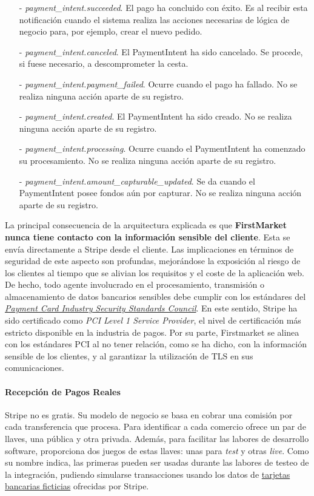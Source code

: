 \documentclass[a4paper,12pt,twoside,openright]{report}
\begin{document}
    \begin{itemize}
    	\item[-] \emph{payment\_intent.succeeded}. El pago ha concluido con éxito. Es al recibir esta notificación cuando el sistema realiza las acciones necesarias de lógica de negocio para, por ejemplo, crear el nuevo pedido.
    	\item[-] \emph{payment\_intent.canceled}. El PaymentIntent ha sido cancelado. Se procede, si fuese necesario, a descomprometer la cesta.
    	\item[-] \emph{payment\_intent.payment\_failed}. Ocurre cuando el pago ha fallado. No se realiza ninguna acción aparte de su registro.
    	\item[-] \emph{payment\_intent.created}. El PaymentIntent ha sido creado. No se realiza ninguna acción aparte de su registro.
    	\item[-] \emph{payment\_intent.processing}. Ocurre cuando el PaymentIntent ha comenzado su procesamiento. No se realiza ninguna acción aparte de su registro.
    	\item[-] \emph{payment\_intent.amount\_capturable\_updated}. Se da cuando el PaymentIntent posee fondos aún por capturar. No se realiza ninguna acción aparte de su registro.
    \end{itemize}
    
    La principal consecuencia de la arquitectura explicada es que \textbf{FirstMarket nunca tiene contacto con la información sensible del cliente}. Esta se envía directamente a Stripe desde el cliente. Las implicaciones en términos de seguridad de este aspecto son profundas, mejorándose la exposición al riesgo de los clientes al tiempo que se alivian los requisitos y el coste de la aplicación web. De hecho, todo agente involucrado en el procesamiento, transmisión o almacenamiento de datos bancarios sensibles debe cumplir con los estándares del \href{https://www.pcisecuritystandards.org/pci_security/}{\emph{Payment Card Industry Security Standards Council}}. En este sentido, Stripe ha sido certificado como \emph{PCI Level 1 Service Provider}, el nivel de certificación más estricto disponible en la industria de pagos. Por su parte, Firstmarket se alinea con los estándares PCI al no tener relación, como se ha dicho, con la información sensible de los clientes, y al garantizar la utilización de TLS en sus comunicaciones.
    
    \paragraph{Recepción de Pagos Reales}
    Stripe no es gratis. Su modelo de negocio se basa en cobrar una comisión por cada transferencia que procesa. Para identificar a cada comercio ofrece un par de llaves, una pública y otra privada. Además, para facilitar las labores de desarrollo software, proporciona dos juegos de estas llaves: unas para \emph{test} y otras \emph{live}. Como su nombre indica, las primeras pueden ser usadas durante las labores de testeo de la integración, pudiendo simularse transacciones usando los datos de \href{https://stripe.com/docs/payments/accept-a-payment#web-test-integration}{tarjetas bancarias ficticias} ofrecidas por Stripe.
    
\end{document}
